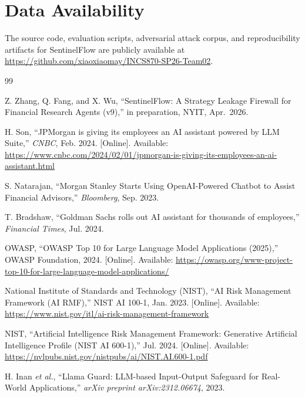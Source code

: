 \documentclass[journal]{IEEEtran}
\begin{document}
\section*{Data Availability}
The source code, evaluation scripts, adversarial attack corpus, and reproducibility artifacts for SentinelFlow are publicly available at \url{https://github.com/xiaoxiaomay/INCS870-SP26-Team02}.

\begin{thebibliography}{99}

Z. Zhang, Q. Fang, and X. Wu, ``SentinelFlow: A Strategy Leakage Firewall for Financial Research Agents (v9),'' in preparation, NYIT, Apr.\ 2026.

H. Son, ``JPMorgan is giving its employees an AI assistant powered by LLM Suite,'' \textit{CNBC}, Feb. 2024. [Online]. Available: \url{https://www.cnbc.com/2024/02/01/jpmorgan-is-giving-its-employees-an-ai-assistant.html}

S. Natarajan, ``Morgan Stanley Starts Using OpenAI-Powered Chatbot to Assist Financial Advisors,'' \textit{Bloomberg}, Sep. 2023.

T. Bradshaw, ``Goldman Sachs rolls out AI assistant for thousands of employees,'' \textit{Financial Times}, Jul. 2024.

OWASP, ``OWASP Top 10 for Large Language Model Applications (2025),'' OWASP Foundation, 2024. [Online]. Available: \url{https://owasp.org/www-project-top-10-for-large-language-model-applications/}

National Institute of Standards and Technology (NIST), ``AI Risk Management Framework (AI RMF),'' NIST AI 100-1, Jan. 2023. [Online]. Available: \url{https://www.nist.gov/itl/ai-risk-management-framework}

NIST, ``Artificial Intelligence Risk Management Framework: Generative Artificial Intelligence Profile (NIST AI 600-1),'' Jul. 2024. [Online]. Available: \url{https://nvlpubs.nist.gov/nistpubs/ai/NIST.AI.600-1.pdf}

H. Inan \textit{et al.}, ``Llama Guard: LLM-based Input-Output Safeguard for Real-World Applications,'' \textit{arXiv preprint arXiv:2312.06674}, 2023.


\end{thebibliography}
\end{document}
